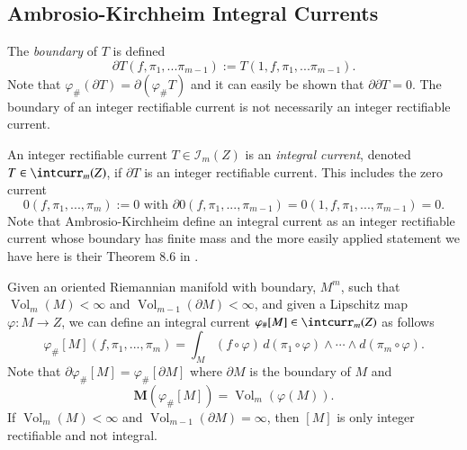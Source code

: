 \documentclass[12pt]{amsart}
\begin{document}
\subsection{Ambrosio-Kirchheim Integral Currents}

The {\em boundary} of $T$ is defined
\begin{equation} \label{def-boundary}
\partial T(f, \pi_1, ... \pi_{m-1}):= T(1, f, \pi_1,...\pi_{m-1}).
\end{equation}
Note that $\varphi_\#(\partial T)=\partial(\varphi_\#T)$ and 
it can easily be shown that $\partial \partial T=0$. 
The boundary of an integer rectifiable current is not necessarily an integer rectifiable current.
  
An integer rectifiable current  $ T\in{{\mathcal I}}_m(Z)$  is an 
{\em integral current}, denoted $T\in \intcurr_m(Z)$,  if $\partial T$ 
is an integer rectifiable current.  This includes the zero current
\begin{equation}
0(f,\pi_1,...,\pi_m):=0 \textrm{ with } 
\partial 0(f, \pi_1,...,\pi_{m-1})=0(1,f,\pi_1,...,\pi_{m-1})=0.
\end{equation}
Note that Ambrosio-Kirchheim  
define an integral current
as an integer rectifiable current whose boundary has finite mass
and the more easily applied statement we have here is their Theorem 8.6 in \cite{AK}.

Given an
oriented Riemannian manifold with boundary, $M^m$, 
such that ${\operatorname{Vol}}_m(M)<\infty$ and ${\operatorname{Vol}}_{m-1}(\partial M) < \infty$, and
given a Lipschitz
map $\varphi: M \to Z$, we can define an integral current
$\varphi_\#[M]\in \intcurr_m(Z)$ as follows
\begin{equation} \label{subman}
\varphi_\#[M] (f, \pi_1,..., \pi_m)=\int_M (f\circ \varphi)\, 
d(\pi_1\circ \varphi) \wedge \cdots \wedge d(\pi_m\circ \varphi).
\end{equation} 
Note that $\partial \varphi_\#[M] = \varphi_\#[\partial M] $ where
$\partial M$ is the boundary of $M$ and 
\begin{equation}
{{\mathbf M}}(\varphi_\#[M])={\operatorname{Vol}}_m(\varphi(M)).
\end{equation}
If ${\operatorname{Vol}}_m(M)<\infty$ and ${\operatorname{Vol}}_{m-1}(\partial M) =\infty$, then
$[M]$ is only integer rectifiable and not integral.
\end{document}
